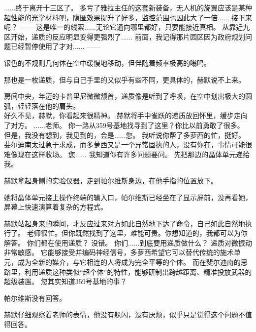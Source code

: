\documentclass[openany]{book}
\begin{document}
\begin{dialogue}
     ......终于离开十三区了。
     多亏了雅拉主任的这套新装备，无人机的旋翼应该是某种超性能的光学材料吧，隐匿效果提升了好多，监控范围也因此大了一倍......
     接下来呢？
     ——
     这是唯一的线索......无论它通向哪里都好，只要能接近真相。
     从靠近九区开始，递质的反应明显变得更强烈了......
     前面，我记得那片园区因为政府规划问题已经暂停使用了才对......
     ——\par
    银色的不规则几何体在空中缓慢地移动，但伴随着频率极高的嗡鸣。\par
    那也是一枚递质，但与自己手里的又似乎有些不同，更具体的，赫默说不上来。\par
    房间中央，年迈的卡普里尼微微颔首，递质像是听到了呼唤，在空中划出极大的圆弧，轻轻落在他的肩头。
    \\
     好久不见，赫默，你看起来很精神。
    赫默将手中雀跃的递质放回怀里，缓步走向了对方。
     ......老师。
     你一路从359号基地找寻到了这里？你比以前勇敢了很多。
     但是，我没有想到，我见到的，会是......您。
     我听说你帮了多萝西的忙，挺好。
     斐尔迪南太过急于求成，而多萝西又是一个异常固执的人，没有你在，事情可能很难像现在这样收场。
     您......
     我知道你有许多问题要问。
     先把那边的晶体单元递给我。\par
    赫默拿起身侧的实验仪器，走到帕尔维斯身边，在他手指的位置放下。\par
    她将晶体单元接上操作终端的输入口，帕尔维斯已经坐在了显示屏前，没再看她，屏幕上快速演算着复杂的方程式。\par
    赫默站起身来的瞬间，才反应过来对方如此自然地下达了命令，自己如此自然地执行了。
     老师很忙。但你既然找到了这里，难能可贵。你想知道的，我都可以为你解答。
     你们都在使用递质？
     没错。
     你们......到底要用递质做什么？
     递质对微振动非常敏感。
     它能够接受并编码神经信号，多萝西希望它可以替代传统的施术单元，成为全新的媒介，与它相连的人将成为完全平等的个体。
     而在斐尔迪南的思路里，利用递质这种类似“超个体”的特性，能够研制出跨越距离、精准投放武器的超级装置。
     您其实知道359号基地的事？\par
    帕尔维斯没有回答。\par
    赫默仔细观察着老师的表情，他没有躲闪，没有厌烦，似乎只是觉得这个问题不值得回答。

\end{dialogue}
\end{document}
